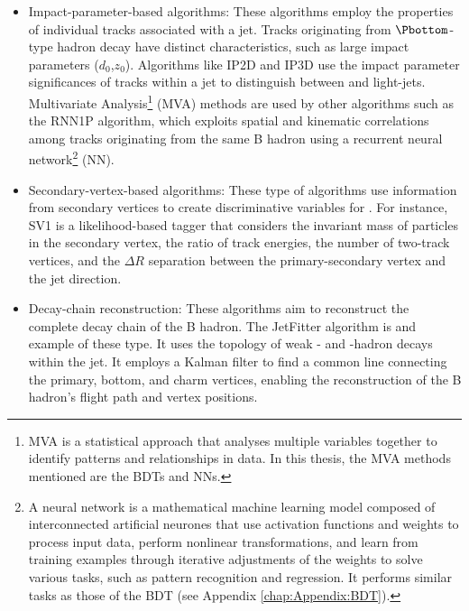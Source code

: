 \begin{itemize}
	\item Impact-parameter-based algorithms:
	These algorithms employ the properties of individual tracks associated with a jet. 
	Tracks originating from $\Pbottom$-type hadron decay have distinct characteristics, 
	such as large impact parameters ($d_0$,$z_0$). Algorithms like IP2D and 
	IP3D\cite{ATLAS:2017bcq} use the impact parameter significances of tracks within a
	jet to distinguish between \bjets and light-jets. Multivariate Analysis\footnote{MVA is 
	a statistical approach that analyses multiple variables together to identify patterns and 
	relationships in data. In this thesis, the MVA methods mentioned are the BDTs and NNs.}
	(MVA) methods are used by 
	other algorithms such as the RNN1P algorithm\cite{ATLAS:2017gpy}, which exploits 
	spatial and kinematic correlations among tracks originating from the same B hadron
	 using a recurrent neural network\footnote{A neural network is a mathematical 
	machine learning model composed of interconnected artificial neurones that use activation 
	functions and weights to process input data, perform nonlinear transformations, and learn 
	from training examples through iterative adjustments of the weights to solve various tasks, 
	such as pattern recognition and regression. It performs similar tasks as those of the BDT 
	(see Appendix \ref{chap:Appendix:BDT}).} (NN).
	
	\item Secondary-vertex-based algorithms: 
	These type of algorithms use information from secondary vertices to create 
	discriminative variables for \btag. For instance, SV1\cite{ATLAS:2017kle} is 
	a likelihood-based tagger that considers the invariant mass of particles in the
	secondary vertex, the ratio of track energies, the number of two-track vertices,
	and the $\Delta R$ separation between the primary-secondary vertex 
	and the jet direction.
	
	\item Decay-chain reconstruction: These algorithms aim to reconstruct the 
	complete decay chain of the B hadron. The JetFitter algorithm\cite{ATLAS:2018nnq} is and example
	of these type. It uses the topology of weak \Pbottom- and \Pcharm-hadron decays 
	within the jet. It employs a Kalman filter\cite{Fruhwirth:1987fm} to find a common line 
	connecting the primary, bottom, and charm vertices, enabling the reconstruction of 
	the B hadron's flight path and vertex positions.
\end{itemize}

